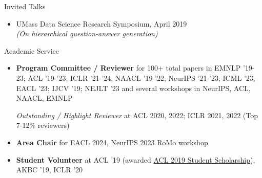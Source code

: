 \documentclass{resume} %
\begin{document}
\begin{rSection}{Invited Talks}
\begin{itemize}[leftmargin=*]
\item UMass Data Science Research Symposium, April 2019 \\
\textit{(On hierarchical question-answer generation)}
\end{itemize}
\end{rSection}

\begin{rSection}{Academic Service}
\vspace*{0.1in}
\begin{itemize}[leftmargin=*]
\item \textbf{Program Committee / Reviewer} for 100+ total papers in EMNLP '19-23; ACL '19-'23; ICLR '21-'24; NAACL '19-'22; NeurIPS '21-'23; ICML '23, EACL '23; IJCV '19; NEJLT '23 and several workshops in NeurIPS, ACL, NAACL, EMNLP

\emph{Outstanding / Highlight Reviewer} at ACL 2020, 2022; ICLR 2021, 2022  (Top 7-12\% reviewers)

\item \textbf{Area Chair} for EACL 2024, NeurIPS 2023 RoMo workshop

\item \textbf{Student Volunteer} at ACL '19 (awarded \href{http://www.acl2019.org/EN/student-scholarship-applications-volunteers.xhtml}{ACL 2019 Student Scholarship}), AKBC '19, ICLR '20
\end{itemize}
\end{rSection}
\end{document}
